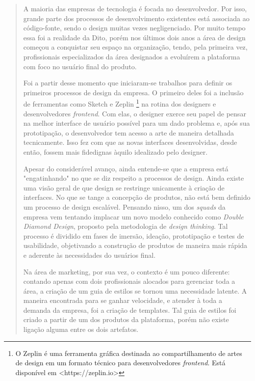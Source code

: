 \begin{quote}
    A maioria das empresas de tecnologia é focada no desenvolvedor. Por isso, grande parte dos processos de desenvolvimento existentes está associada ao código-fonte, sendo o design muitas vezes negligenciado. Por muito tempo essa foi a realidade da Dito, porém nos últimos dois anos a área de design começou a conquistar seu espaço na organização, tendo, pela primeira vez, profissionais especializados da área designados a evoluírem a plataforma com foco no usuário final do produto.
    
    Foi a partir desse momento que iniciaram-se trabalhos para definir os primeiros processos de design da empresa. O primeiro deles foi a inclusão de ferramentas como Sketch e Zeplin \footnote{O Zeplin é uma ferramenta gráfica destinada ao compartilhamento de artes de design em um formato técnico para desenvolvedores \textit{frontend}. Está disponível em <https://zeplin.io>} na rotina dos designers e desenvolvedores \textit{frontend}. Com elas, o designer exerce seu papel de pensar na melhor interface de usuário possível para um dado problema e, após sua prototipação, o desenvolvedor tem acesso a arte de maneira detalhada tecnicamente. Isso fez com que as novas interfaces desenvolvidas, desde então, fossem mais fidedignas àquilo idealizado pelo designer.
    
    Apesar do considerável avanço, ainda entende-se que a empresa está "engatinhando" no que se diz respeito a processos de design. Ainda existe uma visão geral de que design se restringe unicamente à criação de interfaces. No que se tange a concepção de produtos, não está bem definido um processo de design escalável. Pensando nisso, um dos \textit{squads} da empresa vem tentando implacar um novo modelo conhecido como \textit{Double Diamond Design}, proposto pela metodologia de \textit{design thinking}. Tal processo é dividido em fases de imersão, ideação, prototipação e testes de usabilidade, objetivando a construção de produtos de maneira mais rápida e aderente às necessidades do usuários final.
    
    Na área de marketing, por sua vez, o contexto é um pouco diferente: contando apenas com dois profissionais alocados para gerenciar toda a área, a criação de um guia de estilos se tornou uma necessidade latente. A maneira encontrada para se ganhar velocidade, e atender à toda a demanda da empresa, foi a criação de templates. Tal guia de estilos foi criado a partir de um dos produtos da plataforma, porém não existe ligação alguma entre os dois artefatos.
\end{quote}

